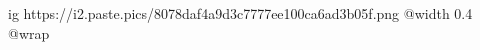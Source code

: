 
 
 
 
 

\ifcmt
  ig https://i2.paste.pics/8078daf4a9d3c7777ee100ca6ad3b05f.png
  @width 0.4
  @wrap 
\fi
